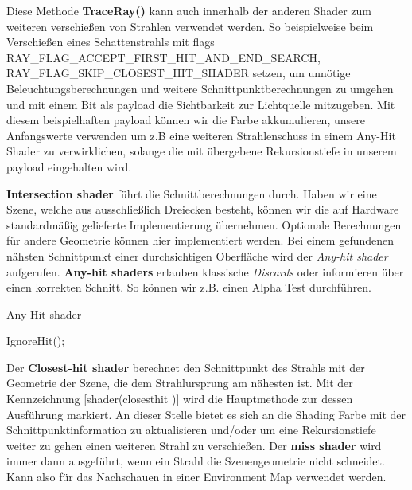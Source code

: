 Diese Methode \textbf{TraceRay()} kann auch innerhalb der anderen Shader zum weiteren verschießen
von Strahlen verwendet werden. So beispielweise beim Verschießen eines Schattenstrahls mit flags 
RAY\_FLAG\_ACCEPT\_FIRST\_HIT\_AND\_END\_SEARCH, \newline
RAY\_FLAG\_SKIP\_CLOSEST\_HIT\_SHADER setzen, um unnötige 
Beleuchtungsberechnungen und weitere Schnittpunktberechnungen zu umgehen und mit einem Bit als payload 
die Sichtbarkeit zur Lichtquelle mitzugeben.
Mit diesem beispielhaften payload können wir die Farbe akkumulieren, unsere  
Anfangswerte verwenden um z.B eine weiteren Strahlenschuss in einem Any-Hit Shader zu verwirklichen,  
solange die mit übergebene Rekursionstiefe in unserem payload eingehalten wird.  

\textbf{Intersection shader} führt die Schnittberechnungen durch.
Haben wir eine Szene, welche aus ausschließlich Dreiecken besteht, können wir
die auf Hardware standardmäßig gelieferte Implementierung übernehmen. 
Optionale Berechnungen für andere Geometrie können hier implementiert werden.
Bei einem gefundenen nähsten Schnittpunkt einer durchsichtigen Oberfläche wird der 
\textit{Any-hit shader} aufgerufen.
\textbf{Any-hit shaders} erlauben klassische \textit{Discards} oder informieren
über einen korrekten Schnitt. So können wir z.B. einen Alpha Test durchführen.

\begin{tcolorbox}
\begin{algorithm}[H]
    \caption{Any-Hit shader}
    \begin{algorithmic}[1]
        \State IgnoreHit();
        \EndIf
    \end{algorithmic}
    \label{alg:any hit}
\end{algorithm}
\end{tcolorbox}

Der \textbf{Closest-hit shader} berechnet den Schnittpunkt des Strahls mit der Geometrie
der Szene, die dem Strahlursprung am nähesten ist.
Mit der Kennzeichnung [shader(\dq closesthit \dq)] wird die Hauptmethode zur 
dessen Ausführung markiert. An dieser Stelle bietet es sich an die Shading Farbe 
mit der Schnittpunktinformation zu aktualisieren und/oder um eine Rekursionstiefe weiter 
zu gehen einen weiteren Strahl zu verschießen. 
Der \textbf{miss shader} wird immer dann ausgeführt, wenn ein Strahl die
Szenengeometrie nicht schneidet. Kann also für das Nachschauen in einer 
Environment Map verwendet werden. 

